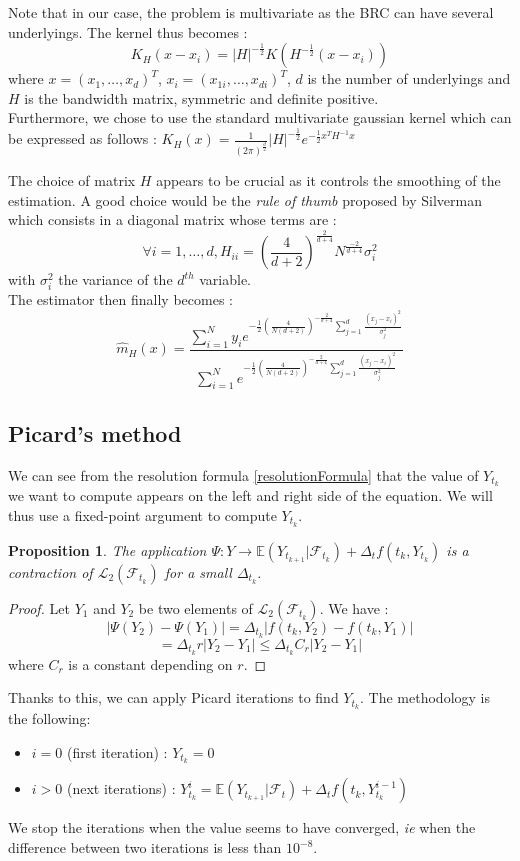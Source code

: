 \documentclass[a4paper,11pt,english]{book}
\newtheorem{prop}{Proposition}
\begin{document}
Note that in our case, the problem is multivariate as the BRC can have several underlyings. The kernel thus becomes : $$K_{H}(x-x_{i}) = |H|^{-\frac{1}{2}}K(H^{-\frac{1}{2}}(x-x_{i}))$$
where $x=(x_{1},\ldots,x_{d})^{T}$, $x_{i}=(x_{1i},\ldots,x_{di})^{T}$, $d$ is the number of underlyings and $H$ is the bandwidth matrix, symmetric and definite positive.\\

Furthermore, we chose to use the standard multivariate gaussian kernel which can be expressed as follows :
$K_{H}(x)=\frac{1}{(2\pi)^{\frac{d}{2}}}|H|^{-\frac{1}{2}}e^{-\frac{1}{2}x^{T}H^{-1}x}$

The choice of matrix $H$ appears to be crucial as it controls the smoothing of the estimation. A good choice would be the \textit{rule of thumb} proposed by Silverman\cite{silverman1986density} which consists in a diagonal matrix whose terms are : $$\forall i=1,\ldots,d, H_{ii} = (\frac{4}{d+2})^{\frac{2}{d+4}}N^{\frac{-2}{d+4}}\sigma_{i}^{2}$$
with $\sigma_{i}^{2}$ the variance of the $d^{th}$ variable.\\

The estimator then finally becomes :
$$\hat{m}_{H}(x)= \frac{\sum_{i=1}^{N}y_{i}e^{-\frac{1}{2}(\frac{4}{N(d+2)})^{-\frac{2}{d+4}}\sum_{j=1}^{d}\frac{(x_{j}-x_{i})^{2}}{\sigma_{j}^{2}}}}{\sum_{i=1}^{N}e^{-\frac{1}{2}(\frac{4}{N(d+2)})^{-\frac{2}{d+4}}\sum_{j=1}^{d}\frac{(x_{j}-x_{i})^{2}}{\sigma_{j}^{2}}}}$$
\subsection{Picard's method}
We can see from the resolution formula \eqref{resolutionFormula} that the value of $Y_{t_{k}}$ we want to compute appears on the left and right side of the equation. We will thus use a fixed-point argument to compute $Y_{t_{k}}$.

\begin{prop}
The application $\Psi : Y \rightarrow \mathbb{E}(Y_{t_{k+1}}|\mathcal{F}_{t_{k}}) + \Delta_{t}f(t_{k},Y_{t_{k}})$ is a contraction of $\mathcal{L}_{2}(\mathcal{F}_{t_{k}})$ for a small $\Delta_{t_{k}}$.
\end{prop}

\begin{proof}
Let $Y_{1}$ and $Y_{2}$ be two elements of $\mathcal{L}_{2}(\mathcal{F}_{t_{k}})$. We have : $$|\Psi(Y_{2})-\Psi(Y_{1})|=\Delta_{t_{k}}|f(t_{k},Y_{2})-f(t_{k},Y_{1})|$$
$$=\Delta_{t_{k}}r |Y_{2}-Y_{1}|\leq \Delta_{t_{k}} C_{r}|Y_{2}-Y_{1}|$$
where $C_{r}$ is a constant depending on $r$.
\end{proof}
Thanks to this, we can apply Picard iterations to find $Y_{t_{k}}$. The methodology is the following:
\begin{itemize}
    \item $i=0$ (first iteration) : $Y_{t_{k}}=0$
    \item $i>0$ (next iterations) : $Y_{t_{k}}^{i}=\mathbb{E}(Y_{t_{k+1}}|\mathcal{F}_{t}) + \Delta_{t}f(t_{k},Y_{t_{k}}^{i-1})$
\end{itemize}
We stop the iterations when the value seems to have converged, \textit{ie} when the difference between two iterations is less than $10^{-8}$.
\end{document}
